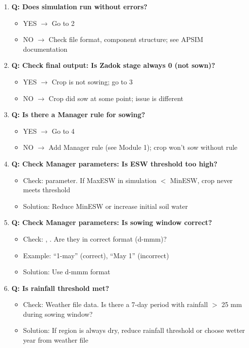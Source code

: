 \begin{enumerate}
  \item \textbf{Q: Does simulation run without errors?}
    \begin{itemize}
      \item YES $\to$ Go to 2
      \item NO $\to$ Check file format, component structure; see APSIM documentation
    \end{itemize}
  
  \item \textbf{Q: Check final output: Is Zadok stage always 0 (not sown)?}
    \begin{itemize}
      \item YES $\to$ Crop is not sowing; go to 3
      \item NO $\to$ Crop did sow at some point; issue is different
    \end{itemize}
  
  \item \textbf{Q: Is there a Manager rule for sowing?}
    \begin{itemize}
      \item YES $\to$ Go to 4
      \item NO $\to$ Add Manager rule (see Module 1); crop won't sow without rule
    \end{itemize}
  
  \item \textbf{Q: Check Manager parameters: Is ESW threshold too high?}
    \begin{itemize}
      \item Check:  parameter. If MaxESW in simulation $<$ MinESW, crop never meets threshold
      \item Solution: Reduce MinESW or increase initial soil water
    \end{itemize}
  
  \item \textbf{Q: Check Manager parameters: Is sowing window correct?}
    \begin{itemize}
      \item Check: , . Are they in correct format (d-mmm)?
      \item Example: ``1-may'' (correct), ``May 1'' (incorrect)
      \item Solution: Use d-mmm format
    \end{itemize}
  
  \item \textbf{Q: Is rainfall threshold met?}
    \begin{itemize}
      \item Check: Weather file data. Is there a 7-day period with rainfall $>$ 25 mm during sowing window?
      \item Solution: If region is always dry, reduce rainfall threshold or choose wetter year from weather file
    \end{itemize}
\end{enumerate}

